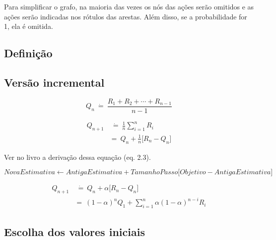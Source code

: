 \documentclass{article}
\begin{document}
        Para simplificar o grafo, na maioria das vezes os nós das ações serão omitidos e as ações serão indicadas nos rótulos das arestas. Além disso, se a probabilidade for 1, ela é omitida.
        
        \subsection{Definição}
        
        \subsection{Versão incremental}
            
            \begin{equation}
                Q_n \ \dot{=} \ \frac{R_1 + R_2 + \cdots + R_{n-1}}{n - 1}
            \end{equation}
            
            \begin{equation}
            \begin{split}
                Q_{n+1} & \ \dot{=} \ \frac{1}{n} \sum_{i=1}^{n} R_i \\
                & = \ Q_n + \frac{1}{n} \Big[ R_n - Q_n \Big]
            \end{split}
            \end{equation}
            
            Ver no livro a derivação dessa equação (eq. 2.3).
            
            \begin{equation}
                NovaEstimativa \leftarrow AntigaEstimativa + TamanhoPasso \Big[ Objetivo - AntigaEstimativa \Big]
            \end{equation}
            
            \begin{equation}
            \begin{split}
                Q_{n+1} & \ \dot{=} \ Q_n + \alpha \Big[ R_n - Q_n \Big] \\
                & = \ (1 - \alpha)^n Q_1 + \sum_{i=1}^{n} \alpha (1 - \alpha)^{n - i} R_i
            \end{split}
            \end{equation}
            
        \subsection{Escolha dos valores iniciais}
            
\end{document}
